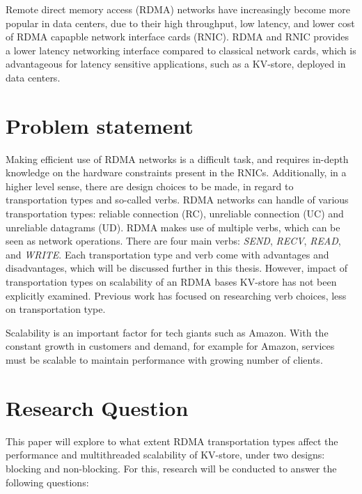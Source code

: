 Remote direct memory access (RDMA) networks have increasingly become more popular in data centers, due to their high throughput, low latency, and lower cost of RDMA capapble network interface cards (RNIC)\cite{kalia2016design, chen2019scalable}.
RDMA and RNIC provides a lower latency networking interface compared to classical network cards, which is advantageous for latency sensitive applications, such as a KV-store, deployed in data centers.


\section{Problem statement}
Making efficient use of RDMA networks is a difficult task, and requires in-depth knowledge on the hardware constraints present in the RNICs\cite{kalia2016design, chen2019scalable}.
Additionally, in a higher level sense, there are design choices to be made, in regard to transportation types and so-called verbs.
RDMA networks can handle of various transportation types: reliable connection (RC), unreliable connection (UC) and unreliable datagrams (UD).
RDMA makes use of multiple verbs, which can be seen as network operations.
There are four main verbs: \textit{SEND}, \textit{RECV}, \textit{READ}, and \textit{WRITE}.
Each transportation type and verb come with advantages and disadvantages, which will be discussed further in this thesis.
However, impact of transportation types on scalability of an RDMA bases KV-store has not been explicitly examined.
Previous work has focused on researching verb choices, less on transportation type\cite{kalia2014using, kalia2016fasst, mitchell2013using}.

Scalability is an important factor for tech giants such as Amazon.
With the constant growth in customers and demand, for example for Amazon, services must be scalable to maintain performance with growing number of clients.

\section{Research Question}
This paper will explore to what extent RDMA transportation types affect the performance and multithreaded scalability of KV-store, under two designs: blocking and non-blocking.
For this, research will be conducted to answer the following questions:

